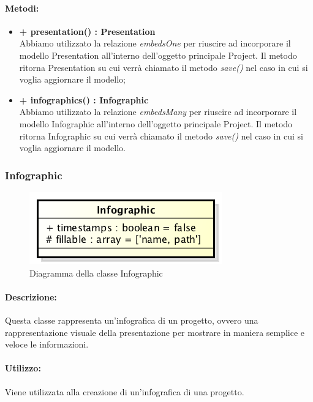 	\paragraph{Metodi:}
	\begin{itemize}
		\item \textbf{+ presentation() : Presentation}\\
		Abbiamo utilizzato la relazione \textit{embedsOne} per riuscire ad incorporare il modello Presentation all'interno dell'oggetto principale Project. Il metodo ritorna Presentation su cui verrà chiamato il metodo \textit{save()} nel caso in cui si voglia aggiornare il modello;
		\item \textbf{+ infographics() : Infographic}\\
		Abbiamo utilizzato la relazione \textit{embedsMany} per riuscire ad incorporare il modello Infographic all'interno dell'oggetto principale Project. Il metodo ritorna Infographic su cui verrà chiamato il metodo \textit{save()} nel caso in cui si voglia aggiornare il modello.
	\end{itemize}

\newpage
\subsubsection{Infographic}

	\begin{figure}[h]
		\centering
		\includegraphics[width=0.5\linewidth]{img/back_end_premi_model_infographic}
		\caption[Diagramma della classe Infographic]{Diagramma della classe Infographic}
		\label{fig:back_end_premi_model_infographic}
	\end{figure}


	\paragraph{Descrizione:}
	Questa classe rappresenta un'\gls{infografica} di un progetto, ovvero una rappresentazione visuale della presentazione per mostrare in maniera semplice e veloce le informazioni.
	
	\paragraph{Utilizzo:}
	Viene utilizzata alla creazione di un'\gls{infografica} di una progetto.

